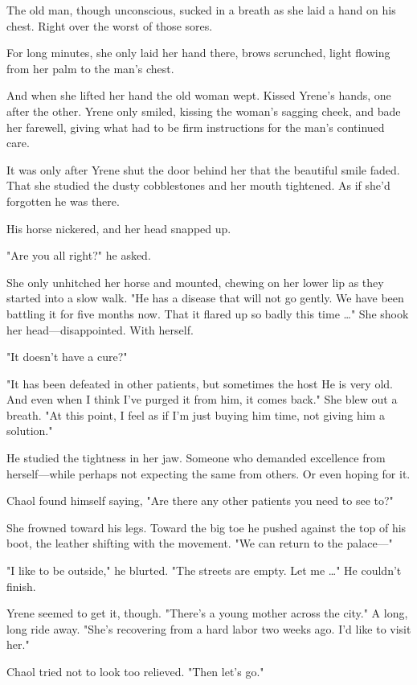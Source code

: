 The old man, though unconscious, sucked in a breath as she laid a hand on his chest. Right over the worst of those sores.

For long minutes, she only laid her hand there, brows scrunched, light flowing from her palm to the man's chest.

And when she lifted her hand  the old woman wept. Kissed Yrene's hands, one after the other. Yrene only smiled, kissing the woman's sagging cheek, and bade her farewell, giving what had to be firm instructions for the man's continued care.

It was only after Yrene shut the door behind her that the beautiful smile faded. That she studied the dusty cobblestones and her mouth tightened. As if she'd forgotten he was there.

His horse nickered, and her head snapped up.

"Are you all right?" he asked.

She only unhitched her horse and mounted, chewing on her lower lip as they started into a slow walk. "He has a disease that will not go gently. We have been battling it for five months now. That it flared up so badly this time \ldots" She shook her head---disappointed. With herself.

"It doesn't have a cure?"

"It has been defeated in other patients, but sometimes the host
 He is very old. And even when I think I've purged it from him, it comes back." She blew out a breath. "At this point, I feel as if I'm just buying him time, not giving him a solution."

He studied the tightness in her jaw. Someone who demanded excellence from herself---while perhaps not expecting the same from others. Or even hoping for it.

Chaol found himself saying, "Are there any other patients you need to see to?"

She frowned toward his legs. Toward the big toe he pushed against the top of his boot, the leather shifting with the movement. "We can return to the palace---"

"I like to be outside," he blurted. "The streets are empty. Let me
\ldots" He couldn't finish.

Yrene seemed to get it, though. "There's a young mother across the city." A long, long ride away. "She's recovering from a hard labor two weeks ago. I'd like to visit her."

Chaol tried not to look too relieved. "Then let's go."

